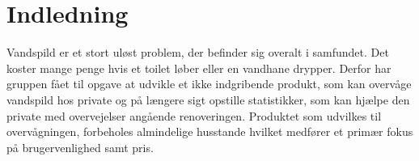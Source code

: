 \section{Indledning}
Vandspild er et stort uløst problem, der befinder sig overalt i samfundet. Det koster mange penge hvis et toilet løber eller en vandhane drypper. Derfor har gruppen fået til opgave at udvikle et ikke indgribende produkt, som kan overvåge vandspild hos private og på længere sigt opstille statistikker, som kan hjælpe den private med overvejelser angående renoveringen. Produktet som udvilkes til overvågningen, forbeholes almindelige husstande hvilket medfører et primær fokus på brugervenlighed samt pris.

